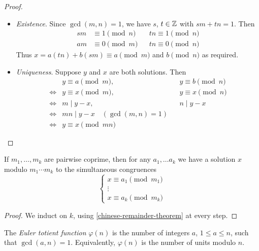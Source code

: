 \documentclass{../template/note}
\begin{document}
    \begin{proof}
        \begin{itemize}
            \item \emph{Existence}. Since \(\gcd(m, n) = 1\), we have \(s\), \(t \in \mathbb Z\) with \(sm + tn = 1\). Then
            \begin{align*}
                sm &\equiv 1 \pmod n && tn \equiv 1 \pmod n \\
                am &\equiv 0 \pmod m && tn \equiv 0 \pmod n
            \end{align*}
            Thus \(x = a(tn) + b(sm) \equiv a \pmod m\) and \(b \pmod n\) as required.
            \item \emph{Uniqueness}. Suppose \(y\) and \(x\) are both solutions. Then
            \begin{align*}
                &y \equiv a \pmod m, && y \equiv b \pmod n \\
                \iff &y \equiv x \pmod m, && y \equiv x \pmod n \\
                \iff &m \mid y - x, && n \mid y - x \\
                \iff &mn \mid y - x \quad (\gcd(m, n) = 1) \\
                \iff &y \equiv x \pmod {mn}
            \end{align*}            
        \end{itemize}
    \end{proof}
    
    \begin{proposition}
        If \(m_1, \dots, m_k\) are pairwise coprime, then for any \(a_1, \dots a_k\) we have a solution \(x\) modulo \(m_1 \cdots m_k\) to the simultaneous congruences
        \[
            \begin{cases}
                x \equiv a_1 \pmod {m_1} \\
                \vdots \\
                x \equiv a_k \pmod {m_k}
            \end{cases}
        \]
    \end{proposition}
    
    \begin{proof}
        We induct on \(k\), using \cref{chinese-remainder-theorem} at every step.
    \end{proof}
    
    \begin{definition}
        The \emph{Euler totient function} \(\varphi(n)\) is the number of integers \(a\), \(1 \leq a \leq n\), such that \(\gcd(a, n) = 1\). Equivalently, \(\varphi(n)\) is the number of units modulo \(n\).
    \end{definition}
    
\end{document}
